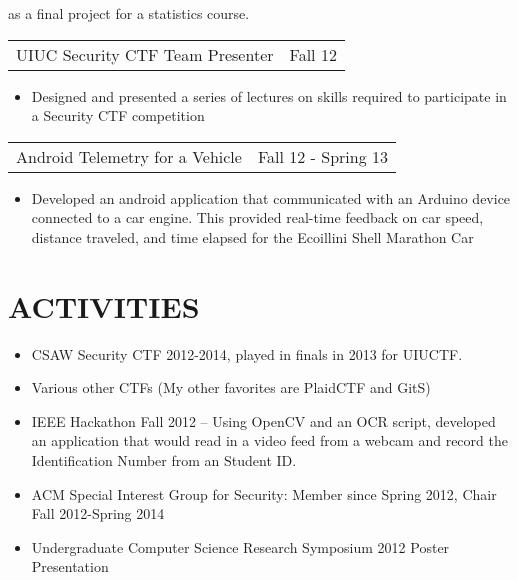 \documentclass[margin]{res}
\begin{document}
\begin{resume}
\begin{itemize}
  as a final project for a statistics course.
\end{itemize}
\begin{tabular}{p{3in} r} %
UIUC Security CTF Team Presenter & Fall 12
\end{tabular}
\begin{itemize} \itemsep -2pt
\item  Designed and presented a series of lectures on skills required to
  participate in a Security CTF competition
\end{itemize}
\begin{tabular}{p{3in} r} %
Android Telemetry for a Vehicle & Fall 12 - Spring 13
\end{tabular}
\begin{itemize} \itemsep -2pt
\item Developed an android application that communicated with an
  Arduino device connected to a car engine.  This provided real-time
  feedback on car speed, distance traveled, and time elapsed for the
  Ecoillini Shell Marathon Car
\end{itemize}

\section{ACTIVITIES}
\begin{itemize} \itemsep -2pt
\item CSAW Security CTF 2012-2014, played in finals in 2013 for UIUCTF.
\item Various other CTFs (My other favorites are PlaidCTF and GitS)
\item IEEE Hackathon Fall 2012 -- Using OpenCV and an OCR script,
  developed an application that would read in a video feed from a
  webcam and record the Identification Number from an Student ID.
\item ACM Special Interest Group for Security: Member since Spring
  2012, Chair Fall 2012-Spring 2014
\item Undergraduate Computer Science Research Symposium 2012 Poster Presentation
\end{itemize}
\end{resume}
\end{document}

